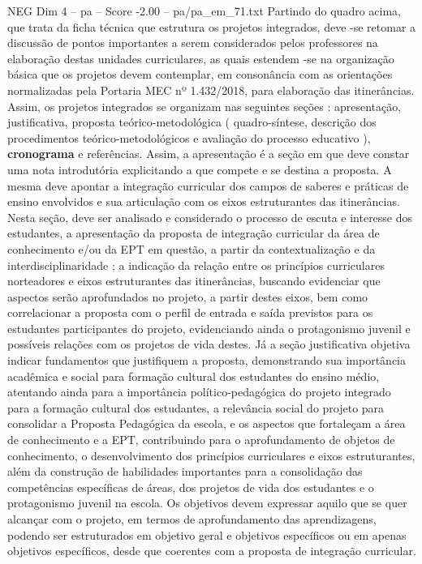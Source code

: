 \begin{textsample}{NEG Dim 4 – pa – Score -2.00 – pa/pa\_em\_71.txt}  \label{ex:f4_neg_277}
Partindo do quadro acima, que trata da ficha técnica que estrutura os projetos integrados, deve -se retomar a discussão de pontos importantes a serem considerados pelos professores na elaboração destas unidades curriculares, as quais estendem -se na organização básica que os projetos devem contemplar, em consonância com as orientações normalizadas pela Portaria MEC nº 1.432/2018, para elaboração das itinerâncias.
Assim, os projetos integrados se organizam nas seguintes seções : apresentação, justificativa, proposta teórico-metodológica ( quadro-síntese, descrição dos procedimentos teórico-metodológicos e avaliação do processo educativo ), \textbf{cronograma} e referências.
Assim, a apresentação é a seção em que deve constar uma nota introdutória explicitando a que compete e se destina a proposta.
A mesma deve apontar a integração curricular dos campos de saberes e práticas de ensino envolvidos e sua articulação com os eixos estruturantes das itinerâncias.
Nesta seção, deve ser analisado e considerado o processo de escuta e interesse dos estudantes, a apresentação da proposta de integração curricular da área de conhecimento e/ou da EPT em questão, a partir da contextualização e da interdisciplinaridade ; a indicação da relação entre os princípios curriculares norteadores e eixos estruturantes das itinerâncias, buscando evidenciar que aspectos serão aprofundados no projeto, a partir destes eixos, bem como correlacionar a proposta com o perfil de entrada e saída previstos para os estudantes participantes do projeto, evidenciando ainda o protagonismo juvenil e possíveis relações com os projetos de vida destes.
Já a seção justificativa objetiva indicar fundamentos que justifiquem a proposta, demonstrando sua importância acadêmica e social para formação cultural dos estudantes do ensino médio, atentando ainda para a importância político-pedagógica do projeto integrado para a formação cultural dos estudantes, a relevância social do projeto para consolidar a Proposta Pedagógica da escola, e os aspectos que fortaleçam a área de conhecimento e a EPT, contribuindo para o aprofundamento de objetos de conhecimento, o desenvolvimento dos princípios curriculares e eixos estruturantes, além da construção de habilidades importantes para a consolidação das competências específicas de áreas, dos projetos de vida dos estudantes e o protagonismo juvenil na escola.
Os objetivos devem expressar aquilo que se quer alcançar com o projeto, em termos de aprofundamento das aprendizagens, podendo ser estruturados em objetivo geral e objetivos específicos ou em apenas objetivos específicos, desde que coerentes com a proposta de integração curricular.

\end{textsample}
